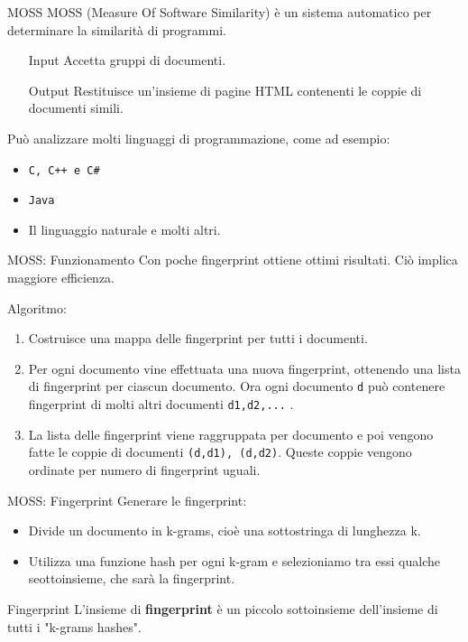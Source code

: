 \documentclass{beamer}
\begin{document}
	\begin{frame}{MOSS}
		MOSS (Measure Of Software Similarity) è un sistema automatico per determinare la similarità di programmi.
		
		\begin{itemize}
			\item[Input] Accetta gruppi di documenti.
			\item[Output] Restituisce un'insieme di pagine HTML contenenti le coppie di documenti simili.
		\end{itemize}
		
		\pause
		Può analizzare molti linguaggi di programmazione, come ad esempio:
		\begin{itemize}
			\item \texttt{C, C++ e C\#}
			\item \texttt{Java}
			\item Il linguaggio naturale e molti altri.
		\end{itemize}
	\end{frame}

	\begin{frame}{MOSS: Funzionamento}
		Con poche fingerprint ottiene ottimi risultati. Ciò implica maggiore efficienza.
		
		Algoritmo:
		\begin{enumerate}[<+->]
			\item Costruisce una mappa delle fingerprint per tutti i documenti.
			\item Per ogni documento vine effettuata una nuova fingerprint, ottenendo una lista di fingerprint per ciascun documento. Ora ogni documento \texttt{d} può contenere fingerprint di molti altri documenti \texttt{d1,d2,...} .
			\item La lista delle fingerprint viene raggruppata per documento e poi vengono fatte le coppie di documenti \texttt{(d,d1), (d,d2)}.
			Queste coppie vengono ordinate per numero di fingerprint uguali.
			
		\end{enumerate}
	\end{frame}
	
	\begin{frame}{MOSS: Fingerprint}
		Generare le fingerprint:
		\begin{itemize}[<+->]
			\item Divide un documento in k-grams, cioè una sottostringa di lunghezza k.
			\item Utilizza una funzione hash per ogni k-gram e selezioniamo tra essi qualche seottoinsieme, che sarà la fingerprint.
		\end{itemize}
		\pause
		\begin{alertblock}{Fingerprint}
			L'insieme di \textbf{fingerprint} è un piccolo sottoinsieme dell'insieme di tutti i "k-grams hashes".
		\end{alertblock}
	\end{frame}
\end{document}
